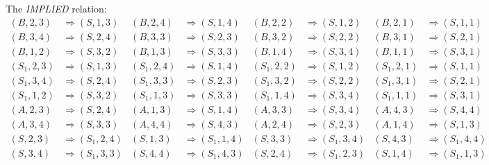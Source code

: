 \documentclass[12pt]{article}  %
\theoremstyle{definition}
\theoremstyle{remark}
\begin{document}
The \emph{IMPLIED} relation:
\begin{align*} %
(B,2,3)  & \Rightarrow (S,1,3)  & (B,2,4)  & \Rightarrow (S,1,4)  & (B,2,2)  & \Rightarrow (S,1,2) & (B,2,1)  & \Rightarrow (S,1,1)
\\
(B,3,4)  & \Rightarrow (S,2,4)  & (B,3,3)  & \Rightarrow (S,2,3)  & (B,3,2)  & \Rightarrow (S,2,2) & (B,3,1)  & \Rightarrow (S,2,1)
\\
(B,1,2)  & \Rightarrow (S,3,2)  & (B,1,3)  & \Rightarrow (S,3,3)  & (B,1,4)  & \Rightarrow (S,3,4) & (B,1,1)  & \Rightarrow (S,3,1)
\\ %
(S_1,2,3)  & \Rightarrow (S,1,3) & (S_1,2,4)  & \Rightarrow (S,1,4) & (S_1,2,2)  & \Rightarrow (S,1,2) & (S_1,2,1)  & \Rightarrow (S,1,1)
\\
(S_1,3,4)  & \Rightarrow (S,2,4)  & (S_1,3,3)  & \Rightarrow (S,2,3)  & (S_1,3,2)  & \Rightarrow (S,2,2) & (S_1,3,1)  & \Rightarrow (S,2,1)
\\
(S_1,1,2)  & \Rightarrow (S,3,2)  &  (S_1,1,3) & \Rightarrow (S,3,3)  & (S_1,1,4)  & \Rightarrow (S,3,4)  & (S_1,1,1)  & \Rightarrow (S,3,1)
\\ %
(A,2,3)  & \Rightarrow (S,2,4)    &  (A,1,3) & \Rightarrow (S,1,4)    & (A,3,3)  & \Rightarrow (S,3,4)    & (A,4,3)  & \Rightarrow (S,4,4)
\\
(A,3,4)  & \Rightarrow (S,3,3)    &  (A,4,4) & \Rightarrow (S,4,3)    & (A,2,4)  & \Rightarrow (S,2,3)    & (A,1,4)  & \Rightarrow (S,1,3)
\\ %
(S,2,3)  & \Rightarrow (S_1,2,4)  &  (S,1,3) & \Rightarrow (S_1,1,4)  & (S,3,3)  & \Rightarrow (S_1,3,4)  & (S,4,3)  & \Rightarrow (S_1,4,4)
\\
(S,3,4)  & \Rightarrow (S_1,3,3)  &  (S,4,4) & \Rightarrow (S_1,4,3)  & (S,2,4)  & \Rightarrow (S_1,2,3)  & (S,1,4)  & \Rightarrow (S_1,1,3)
\end{align*}
\end{document}
